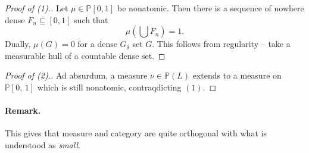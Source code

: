 \begin{proof}[Proof of (1).] Let \( \mu \in \mathbb{P}[0,1] \) be nonatomic. Then there is a sequence of nowhere dense \( F_n \subseteq [0,1] \) such that
    \[ 
       \mu \left( \bigcup F_n \right) = 1. 
   \]
Dually, \( \mu(G) = 0 \) for a dense \( G_\delta \) set \( G \). This follows from regularity -- take a measurable hull of a countable dense set.
\end{proof}

\begin{proof}[Proof of (2).]
    Ad absurdum, a measure \( \nu \in \mathbb{P}(L) \) extends to a measure on \( \mathbb{P}[0,\,1] \) which is still nonatomic, contraqdicting \( (1) \).
\end{proof}

\paragraph{Remark.} This gives that measure and category are quite orthogonal with what is understood as \emph{small}.

